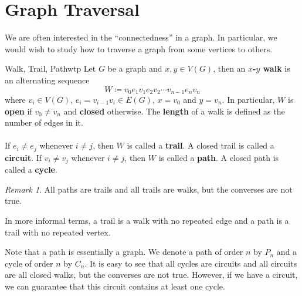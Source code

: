 \documentclass[math, code]{amznotes}
\theoremstyle{remark}
\newtheorem*{remark}{Remark}
\begin{document}
\section{Graph Traversal}
We are often interested in the ``connectedness'' in a graph. In particular, we would wish to study how to traverse a graph from some vertices to others.
\begin{dfnbox}{Walk, Trail, Path}{wtp}
    Let $G$ be a graph and $x, y \in V(G)$, then an {\color{red} \textbf{$x$-$y$ walk}} is an alternating sequence
    \begin{equation*}
        W \coloneqq v_0e_1v_1e_2v_2\cdots v_{n - 1}e_nv_n
    \end{equation*}
    where $v_i \in V(G)$, $e_i = v_{i - 1}v_i \in E(G)$, $x = v_0$ and $y = v_n$. In particular, $W$ is {\color{red} \textbf{open}} if $v_0 \neq v_n$ and {\color{red} \textbf{closed}} otherwise. The {\color{red} \textbf{length}} of a walk is defined as the number of edges in it.
    \\\\
    If $e_i \neq e_j$ whenever $i \neq j$, then $W$ is called a {\color{red} \textbf{trail}}. A closed trail is called a {\color{red} \textbf{circuit}}. If $v_i \neq v_j$ whenever $i \neq j$, then $W$ is called a {\color{red} \textbf{path}}. A closed path is called a {\color{red} \textbf{cycle}}.
\end{dfnbox}
\begin{notebox}
    \begin{remark}
        All paths are trails and all trails are walks, but the converses are not true.
    \end{remark}
\end{notebox}
In more informal terms, a trail is a walk with no repeated edge and a path is a trail with no repeated vertex.

Note that a path is essentially a graph. We denote a path of order $n$ by $P_n$ and a cycle of order $n$ by $C_n$. It is easy to see that all cycles are circuits and all circuits are all closed walks, but the converses are not true. However, if we have a circuit, we can guarantee that this circuit contains at least one cycle.
\end{document}
